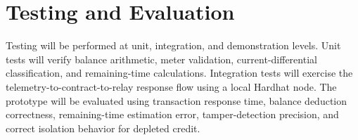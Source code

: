 \section{Testing and Evaluation}
Testing will be performed at unit, integration, and demonstration levels. Unit tests will verify balance arithmetic, meter validation, current-differential classification, and remaining-time calculations. Integration tests will exercise the telemetry-to-contract-to-relay response flow using a local Hardhat node. The prototype will be evaluated using transaction response time, balance deduction correctness, remaining-time estimation error, tamper-detection precision, and correct isolation behavior for depleted credit.

